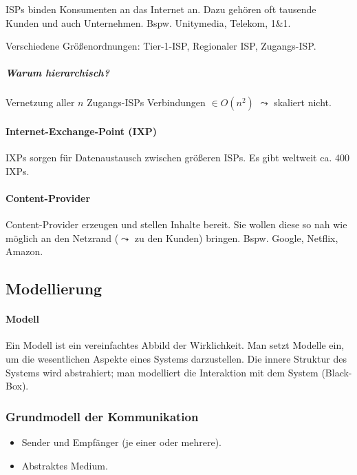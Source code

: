 \documentclass[a4paper, 14pt]{article}
\begin{document}
	ISPs binden Konsumenten an das Internet an.
	Dazu gehören oft tausende Kunden und auch Unternehmen.
	Bspw. Unitymedia, Telekom, 1\&1.

	Verschiedene Größenordnungen: Tier-1-ISP, Regionaler ISP, Zugangs-ISP.

	\subparagraph{Warum hierarchisch?}

	Vernetzung aller $n$ Zugangs-ISPs Verbindungen $\in O(n^2)$ $\leadsto$ skaliert nicht.

	\paragraph{Internet-Exchange-Point (IXP)}

	IXPs sorgen für Datenaustausch zwischen größeren ISPs.
	Es gibt weltweit ca. 400 IXPs.

	\paragraph{Content-Provider}

	Content-Provider erzeugen und stellen Inhalte bereit.
	Sie wollen diese so nah wie möglich an den Netzrand ($\leadsto$ zu den Kunden) bringen.
	Bspw. Google, Netflix, Amazon.

	\subsection{Modellierung}

	\paragraph{Modell}

	Ein Modell ist ein vereinfachtes Abbild der Wirklichkeit.
	Man setzt Modelle ein, um die wesentlichen Aspekte eines Systems darzustellen.
	Die innere Struktur des Systems wird abstrahiert; man modelliert die Interaktion mit dem System (Black-Box).

	\subsubsection{Grundmodell der Kommunikation}

	\begin{itemize}
		\item Sender und Empfänger (je einer oder mehrere).
		\item Abstraktes Medium.
	\end{itemize}
\end{document}
